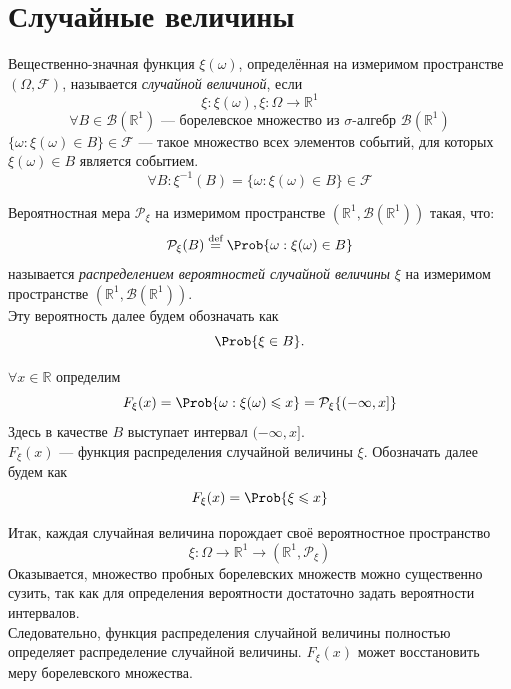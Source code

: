 \section{Случайные величины}
\begin{definition}
	Вещественно-значная функция $\xi (\omega)$, определённая на измеримом пространстве $(\Omega, \mathcal{F})$, называется \textit{случайной величиной}, если
	\[
		\xi: \xi(\omega), \xi : \Omega \rightarrow \mathbb{R}^1
	\]
	\[
		\forall B \in \mathcal{B}(\mathbb{R}^1) \text{ --- борелевское множество из $\sigma$-алгебр $\mathcal{B}(\mathbb{R}^1)$}
	\]
	$\{ \omega : \xi(\omega) \in B \} \in \mathcal{F}$ --- такое множество всех элементов событий, для которых $\xi(\omega) \in B$ является событием.
	\begin{equation}
		\forall B : \xi^{-1}(B) = \{ \omega : \xi(\omega) \in B \} \in \mathcal{F}
	\end{equation}
\end{definition}
\begin{definition}
Вероятностная мера $\mathcal{P}_\xi$ на измеримом пространстве $(\mathbb{R}^1, \mathcal{B}(\mathbb{R}^1))$ такая, что:
\[
	\mathcal{P}_\xi (B) \overset{\textrm{def}}{=} \Prob \{ \omega : \xi (\omega) \in B \}
\]
называется \textit{распределением вероятностей случайной величины} $\xi$ на измеримом пространстве $(\mathbb{R}^1, \mathcal{B}(\mathbb{R}^1))$. \\
Эту вероятность далее будем обозначать как
\[
	\Prob \{ \xi \in B \}.
\]
\end{definition}
\begin{definition}
	$\forall x \in \mathbb{R}$ определим
	\[
		F_\xi (x) = \Prob \{ \omega : \xi (\omega) \leqslant x \} = \mathcal{P}_\xi \{ (-\infty, x] \}
	\]
	Здесь в качестве $B$ выступает интервал $(-\infty, x]$. \\
	$F_\xi (x)$ --- функция распределения случайной величины $\xi$. Обозначать далее будем как
	\[
		F_\xi (x) = \Prob \{ \xi \leqslant x \}
	\]
\end{definition}
Итак, каждая случайная величина порождает своё вероятностное пространство
\[
	\xi : \Omega \rightarrow \mathbb{R}^1 \rightarrow (\mathbb{R}^1, \mathcal{P}_\xi)
\]
Оказывается, множество пробных борелевских множеств можно существенно сузить, так как для определения вероятности достаточно задать вероятности интервалов. \\
Следовательно, функция распределения случайной величины полностью определяет распределение случайной величины. $F_\xi (x)$ может восстановить меру борелевского множества.\\
